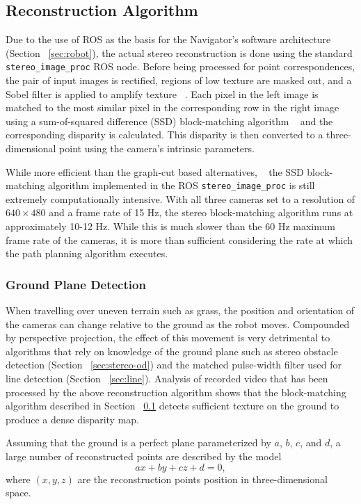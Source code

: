 \documentclass[twocolumn,11pt]{article}
\begin{document}
\subsection{Reconstruction Algorithm}
\label{sec:stereo-algo}
Due to the use of ROS as the basis for the Navigator's software architecture
(Section ~\ref{sec:robot}), the actual stereo reconstruction is done using the
standard \texttt{stereo\_image\_proc} ROS node. Before being processed for
point correspondences, the pair of input images is rectified, regions of low
texture are masked out, and a Sobel filter is applied to amplify texture
~\cite{stereo}. Each pixel in the left image is matched to the most similar
pixel in the corresponding row in the right image using a sum-of-squared
difference (SSD) block-matching algorithm ~\cite{stereo} and the corresponding
disparity is calculated.  This disparity is then converted to a
three-dimensional point using the camera's intrinsic parameters.

While more efficient than the graph-cut based alternatives, ~\cite{stereo} the
SSD block-matching algorithm implemented in the ROS
\texttt{stereo\_image\_proc} is still extremely computationally intensive. With
all three cameras set to a resolution of $640 \times 480$ and a frame rate of
15 Hz, the stereo block-matching algorithm runs at approximately 10-12 Hz.
While this is much slower than the 60 Hz maximum frame rate of the cameras, it
is more than sufficient considering the rate at which the path planning
algorithm executes.

\subsubsection{Ground Plane Detection}
\label{sec:stereo-ground}
When travelling over uneven terrain such as grass, the position and orientation
of the cameras can change relative to the ground as the robot moves. Compounded
by perspective projection, the effect of this movement is very detrimental to
algorithms that rely on knowledge of the ground plane such as stereo obstacle
detection (Section ~\ref{sec:stereo-od}) and the matched pulse-width filter
used for line detection (Section ~\ref{sec:line}). Analysis of recorded video
that has been processed by the above reconstruction algorithm shows that the
block-matching algorithm described in Section ~\ref{sec:stereo-algo} detects
sufficient texture on the ground to produce a dense disparity map.

Assuming that the ground is a perfect plane parameterized by $a$, $b$, $c$, and
$d$, a large number of reconstructed points are described by the model
\begin{equation}
	ax + by + cz + d = 0,
	\label{eq:stereo-ground}
\end{equation}
where $(x, y, z)$ are the reconstruction points position in three-dimensional
space.
\end{document}
